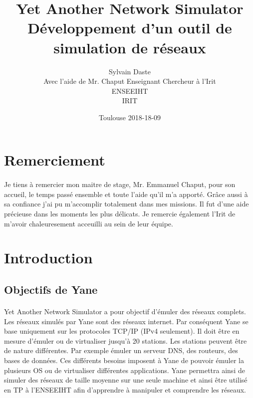 \documentclass{article}
\begin{document}
	\title{Yet Another Network Simulator\\Développement d'un outil de simulation de réseaux}
	\date{Toulouse 2018-18-09}
	\author{Sylvain Daste\\Avec l'aide de Mr. Chaput Enseignant Chercheur à l'Irit\\ENSEEIHT\\IRIT}
	\maketitle



  	\newpage
	\tableofcontents
  	\newpage
	
	
	\section{Remerciement}
	\paragraph{}
	Je tiens à remercier mon maitre de stage, Mr. Emmanuel Chaput, pour son accueil, le temps passé ensemble et toute l'aide qu'il m'a apporté. Grâce aussi à sa confiance j'ai pu m'accomplir totalement dans mes missions. Il fut d'une aide précieuse dans les moments les plus délicats. Je remercie également l'Irit de m'avoir chaleuresement acceuilli au sein de leur équipe.
	\newpage


	\section{Introduction}


	\subsection{Objectifs de Yane}
	
	\paragraph{}
	Yet Another Network Simulator a pour objectif d'émuler des réseaux complets. Les réseaux simulés par Yane sont des réseaux internet. Par conséquent Yane se base uniquement sur les protocoles TCP/IP (IPv4 seulement). Il doit être en mesure d'émuler ou de virtualiser jusqu'à 20 stations. Les stations peuvent être de nature différentes. Par exemple émuler un serveur DNS, des routeurs, des bases de données. Ces différents besoins imposent à Yane de pouvoir émuler la plusieurs OS ou de virtualiser différentes applications. Yane permettra ainsi de simuler des réseaux de taille moyenne sur une seule machine et ainsi être utilisé en TP à l'ENSEEIHT afin d'apprendre à manipuler et comprendre les réseaux.
	
\end{document}
